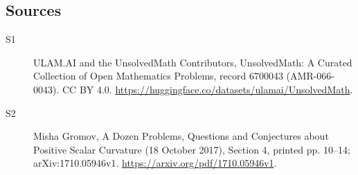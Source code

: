 \documentclass[11pt]{article}
\begin{document}
\subsection{Sources}
\begin{description}
\item[\hypertarget{source:6700043:1}{S1}] ULAM.AI and the UnsolvedMath Contributors, UnsolvedMath: A Curated Collection of Open Mathematics Problems, record 6700043 (AMR-066-0043). CC BY 4.0. \url{https://huggingface.co/datasets/ulamai/UnsolvedMath}.
\item[\hypertarget{source:6700043:2}{S2}] Misha Gromov, A Dozen Problems, Questions and Conjectures about Positive Scalar Curvature (18 October 2017), Section 4, printed pp. 10--14; arXiv:1710.05946v1. \url{https://arxiv.org/pdf/1710.05946v1}.
\end{description}
\label{end:6700043}
\end{document}
